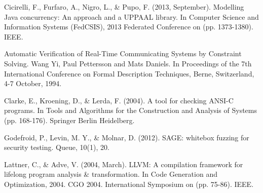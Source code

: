 \documentclass[conference]{IEEEtran}
\begin{document}
\begin{thebibliography}{1}
Cicirelli, F., Furfaro, A., Nigro, L., \& Pupo, F. (2013, September). Modelling Java concurrency: An approach and a UPPAAL library. In Computer Science and Information Systems (FedCSIS), 2013 Federated Conference on (pp. 1373-1380). IEEE.

Automatic Verification of Real-Time Communicating Systems by Constraint Solving. Wang Yi, Paul Pettersson and Mats Daniels. In Proceedings of the 7th International Conference on Formal 
Description Techniques, Berne, Switzerland, 4-7 October, 1994.

Clarke, E., Kroening, D., \& Lerda, F. (2004). A tool for checking ANSI-C programs. In Tools and Algorithms for the Construction and Analysis of Systems (pp. 168-176). Springer Berlin Heidelberg.

 Godefroid, P., Levin, M. Y., \& Molnar, D. (2012). SAGE: whitebox fuzzing for security testing. Queue, 10(1), 20.

Lattner, C., \& Adve, V. (2004, March). LLVM: A compilation framework for lifelong program analysis \& transformation. In Code Generation and Optimization, 2004. CGO 2004. International Symposium on (pp. 75-86). IEEE.

\end{thebibliography}
\end{document}

